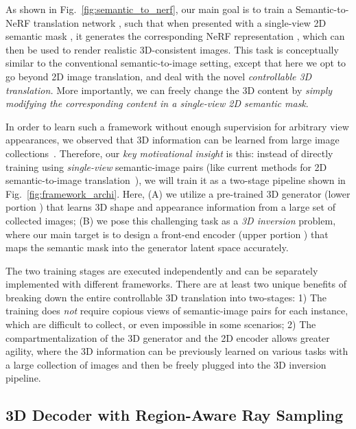 \documentclass[runningheads]{llncs}
\begin{document}
As shown in Fig.~\ref{fig:semantic_to_nerf}, our main goal is to train a Semantic-to-NeRF translation network , such that when presented with a single-view 2D semantic mask , it generates the corresponding NeRF representation , which can then be used to render realistic 3D-consistent images. This task is conceptually similar to the conventional semantic-to-image setting, except that here we opt to go beyond 2D image translation, and deal with the novel \emph{controllable 3D translation.} More importantly, we can freely change the 3D content by \emph{simply modifying the corresponding content in a single-view 2D semantic mask}.




In order to learn such a framework without enough supervision for arbitrary view appearances, we observed that 3D information can be learned from large image collections~\cite{kanazawa2018learning,chan2021pi,chan2021efficient}. Therefore, our \emph{key motivational insight} is this: instead of directly training  using \emph{single-view} semantic-image pairs  (like current methods for 2D semantic-to-image translation~\cite{wang2018high,park2019semantic}), we will train it as a two-stage pipeline shown in Fig.~\ref{fig:framework_archi}. Here, (A) we utilize a pre-trained 3D generator (lower portion ) that learns 3D shape and appearance information from a large set of collected images; (B) we pose this challenging task as a \emph{3D inversion} problem, where our main target is to design a front-end encoder (upper portion ) that maps the semantic mask into the generator latent space accurately. 

The two training stages are executed independently and can be separately implemented with different frameworks. There are at least two unique benefits of breaking down the entire controllable 3D translation into two-stages: 1) The training does \emph{not} require copious views of semantic-image pairs for each instance, which are difficult to collect, or even impossible in some scenarios; 2) The compartmentalization of the 3D generator and the 2D encoder allows greater agility, where the 3D information can be previously learned on various tasks with a large collection of images and then be freely plugged into the 3D inversion pipeline.



\subsection{3D Decoder with Region-Aware Ray Sampling}
\end{document}
